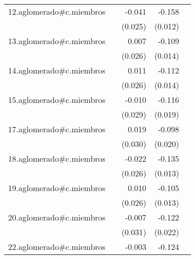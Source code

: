 {\begin{longtable}{l*{4}{D{.}{.}{-1}}}
\addlinespace
12.aglomerado#c.miembros&                     &      -0.041         &      -0.158\sym{***}&                     \\
            &                     &     (0.025)         &     (0.012)         &                     \\
\addlinespace
13.aglomerado#c.miembros&                     &       0.007         &      -0.109\sym{***}&                     \\
            &                     &     (0.026)         &     (0.014)         &                     \\
\addlinespace
14.aglomerado#c.miembros&                     &       0.011         &      -0.112\sym{***}&                     \\
            &                     &     (0.026)         &     (0.014)         &                     \\
\addlinespace
15.aglomerado#c.miembros&                     &      -0.010         &      -0.116\sym{***}&                     \\
            &                     &     (0.029)         &     (0.019)         &                     \\
\addlinespace
17.aglomerado#c.miembros&                     &       0.019         &      -0.098\sym{***}&                     \\
            &                     &     (0.030)         &     (0.020)         &                     \\
\addlinespace
18.aglomerado#c.miembros&                     &      -0.022         &      -0.135\sym{***}&                     \\
            &                     &     (0.026)         &     (0.013)         &                     \\
\addlinespace
19.aglomerado#c.miembros&                     &       0.010         &      -0.105\sym{***}&                     \\
            &                     &     (0.026)         &     (0.013)         &                     \\
\addlinespace
20.aglomerado#c.miembros&                     &      -0.007         &      -0.122\sym{***}&                     \\
            &                     &     (0.031)         &     (0.022)         &                     \\
\addlinespace
22.aglomerado#c.miembros&                     &      -0.003         &      -0.124\sym{***}&                     \\

\end{longtable}}
